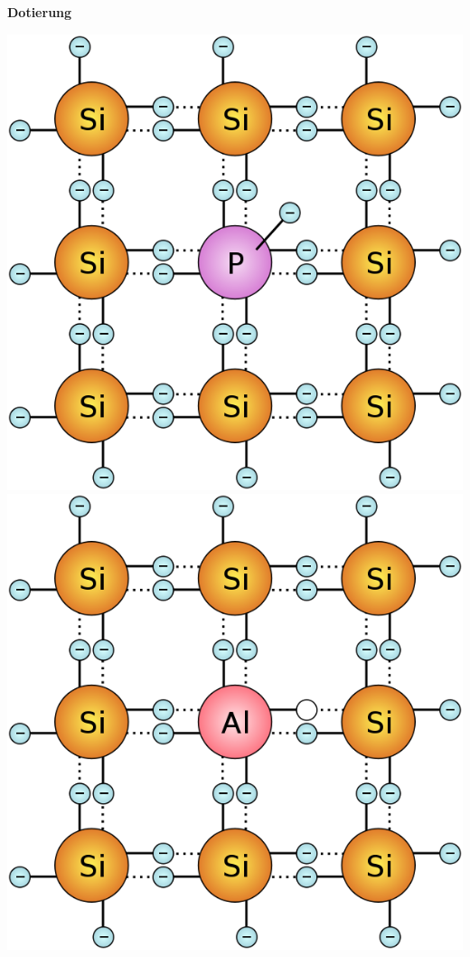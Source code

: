 \documentclass[a4paper, 6pt, landscape]{scrartcl}
\newcommand{\dis}[1]{\hspace{#1cm}}
\begin{document}
\begin{multicols*}{4}
          \textbf{Dotierung}\\
      \vspace{-0.1cm}
      \begin{minipage}[t]{0.45\columnwidth}
        \includegraphics[scale=0.06]{source/n-dot.png}\dis{.15}
        \includegraphics[scale=0.06]{source/p-dot.png}\\

\end{minipage}
\end{multicols*}
\end{document}
